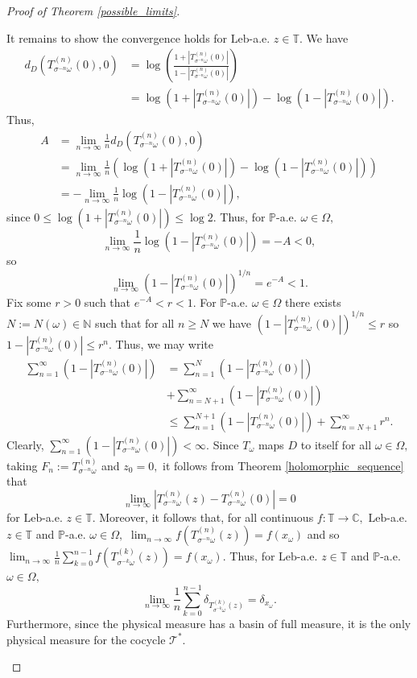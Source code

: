 \documentclass[12pt,reqno]{amsart}
\numberwithin{theorem}{section}
\begin{document}
\begin{proof}[Proof of Theorem \ref{possible_limits}]
\begin{description}
    It remains to show the convergence holds for $\text{Leb}$-a.e. $z\in\mathbb{T}.$ We have \begin{align*}
    d_{D}(T_{\sigma^{-n}\omega}^{(n)}(0),0)&=\log\left(\frac{1+|T_{\sigma^{-n}\omega}^{(n)}(0)|}{1-|T_{\sigma^{-n}\omega}^{(n)}(0)|}\right)\\&=\log(1+|T_{\sigma^{-n}\omega}^{(n)}(0)|)-\log(1-|T_{\sigma^{-n}\omega}^{(n)}(0)|).
\end{align*} Thus, \begin{align*}
    A&=\lim_{n\to\infty}\frac{1}{n}d_{D}(T_{\sigma^{-n}\omega}^{(n)}(0),0)\\&=\lim_{n\to\infty}\frac{1}{n}\left(\log(1+|T_{\sigma^{-n}\omega}^{(n)}(0)|)-\log(1-|T_{\sigma^{-n}\omega}^{(n)}(0)|)\right)\\&=-\lim_{n\to\infty}\frac{1}{n}\log(1-|T_{\sigma^{-n}\omega}^{(n)}(0)|),
\end{align*} since $0\le\log(1+|T_{\sigma^{-n}\omega}^{(n)}(0)|)\le\log2.$ Thus, for $\mathbb{P}$-a.e. $\omega\in\Omega,$ $$\lim_{n\to\infty}\frac{1}{n}\log(1-|T_{\sigma^{-n}\omega}^{(n)}(0)|)=-A<0,$$ so $$\lim_{n\to\infty}(1-|T_{\sigma^{-n}\omega}^{(n)}(0)|)^{1/n}=e^{-A}<1.$$ Fix some $r>0$ such that $e^{-A}<r<1.$ For $\mathbb{P}$-a.e. $\omega\in\Omega$ there exists $N:=N(\omega)\in\mathbb{N}$ such that for all $n\ge N$ we have $(1-|T_{\sigma^{-n}\omega}^{(n)}(0)|)^{1/n}\le r$ so $1-|T_{\sigma^{-n}\omega}^{(n)}(0)|\le r^n.$ Thus, we may write \begin{align*}
    \sum_{n=1}^{\infty}(1-|T_{\sigma^{-n}\omega}^{(n)}(0)|)&=\sum_{n=1}^{N}(1-|T_{\sigma^{-n}\omega}^{(n)}(0)|)\\&+\sum_{n=N+1}^{\infty}(1-|T_{\sigma^{-n}\omega}^{(n)}(0)|)\\&\le\sum_{n=1}^{N+1}(1-|T_{\sigma^{-n}\omega}^{(n)}(0)|)+\sum_{n=N+1}^{\infty}r^n.
\end{align*} Clearly, $\sum_{n=1}^{\infty}(1-|T_{\sigma^{-n}\omega}^{(n)}(0)|)<\infty.$  Since $T_{\omega}$ maps $D$ to itself for all $\omega\in\Omega,$ taking $F_{n}:=T_{\sigma^{-n}\omega}^{(n)}$ and $z_{0}=0,$ it follows from Theorem \ref{holomorphic_sequence} that $$\lim_{n\to\infty}|T_{\sigma^{-n}\omega}^{(n)}(z)-T_{\sigma^{-n}\omega}^{(n)}(0)|=0$$ for $\text{Leb}$-a.e. $z\in\mathbb{T}.$ Moreover, it follows that, for all continuous $f:\mathbb{T}\to\mathbb{C},$ $\text{Leb}$-a.e. $z\in\mathbb{T}$ and $\mathbb{P}$-a.e. $\omega\in\Omega,$ $\lim_{n\to\infty}f(T_{\sigma^{-n}\omega}^{(n)}(z))=f(x_{\omega})$ and so $\lim_{n\to\infty}\frac{1}{n}\sum_{k=0}^{n-1}f(T_{\sigma^{-k}\omega}^{(k)}(z))=f(x_{\omega}).$ Thus, for $\text{Leb}$-a.e. $z\in\mathbb{T}$ and $\mathbb{P}$-a.e. $\omega\in\Omega,$ $$\lim_{n\to\infty}\frac{1}{n}\sum_{k=0}^{n-1}\delta_{T_{\sigma^{-k}\omega}^{(k)}(z)}=\delta_{x_{\omega}}.$$ Furthermore, since the physical measure has a basin of full measure, it is the only physical measure for the cocycle $\mathcal{T}^{*}$. 
    \end{description}
\end{proof}
\end{document}
